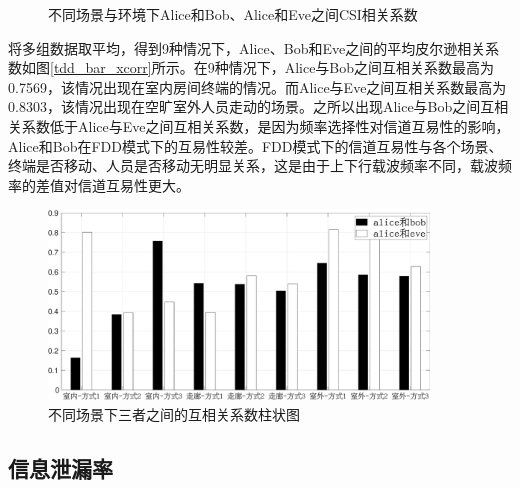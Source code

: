 \documentclass[master]{seuthesis} %
\begin{document}
\begin{Main}
\begin{figure}
{    }
    \caption{不同场景与环境下Alice和Bob、Alice和Eve之间CSI相关系数}{} %
    \label{fdd_csi_xcorr}
\end{figure}

将多组数据取平均，得到9种情况下，Alice、Bob和Eve之间的平均皮尔逊相关系数如图\ref{tdd_bar_xcorr}所示。在9种情况下，Alice与Bob之间互相关系数最高为0.7569，该情况出现在室内房间终端的情况。而Alice与Eve之间互相关系数最高为0.8303，该情况出现在空旷室外人员走动的场景。之所以出现Alice与Bob之间互相关系数低于Alice与Eve之间互相关系数，是因为频率选择性对信道互易性的影响，Alice和Bob在FDD模式下的互易性较差。FDD模式下的信道互易性与各个场景、终端是否移动、人员是否移动无明显关系，这是由于上下行载波频率不同，载波频率的差值对信道互易性更大。

\begin{figure}[htbp!]
    \centering \includegraphics[width=0.9\textwidth]{images/fdd-xcorr/bar2.eps}
    \caption{不同场景下三者之间的互相关系数柱状图}
    \label{fdd_bar_xcorr}
\end{figure}

\subsection{信息泄漏率}


\end{Main}
\end{document}
